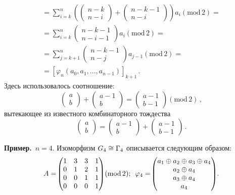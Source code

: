 \begin{multicols}{2}
\noindent
  \begin{multline*}
    {}=\sum\limits^n_{i=k} \left( \begin{pmatrix} n-k\\ n-i\end{pmatrix}+ 
 \begin{pmatrix} n-k-1\\ n-i\end{pmatrix}\right) 
 a_i \left( \mathrm{mod}\,2\right) ={}\\
  {}= 
  \sum\limits^n_{i=k} \begin{pmatrix} n-k-1\\ n-i-1\end{pmatrix} 
  a_i\left( \mathrm{mod}\,2\right)={}\\
  {}=\sum\limits^n_{j=k+1} \begin{pmatrix} n-k-1\\ n-j\end{pmatrix} 
  a_{j-1} \left(\mathrm{mod}\,2\right)={}\\
  {}=
  \left[ \varphi_n\left( a_0, a_1, \ldots , a_{n-1}\right)\right]_{k+1}\,.
  \end{multline*}
  Здесь использовалось соотношение: 
  $$
  \begin{pmatrix}
  a\\b\end{pmatrix} +\begin{pmatrix}
  a-1\\b \end{pmatrix}= \begin{pmatrix}
  a-1\\ b-1 \end{pmatrix} \left( \mathrm{mod}\,2\right)\,,
  $$
  вытекающее из известного комбинаторного тождества
  $$
  \begin{pmatrix}
  a\\b\end{pmatrix}=\begin{pmatrix}
  a-1\\ b \end{pmatrix}+\begin{pmatrix}
  a-1\\ b-1\end{pmatrix}\,.
  $$
  
  
  \noindent
  \textbf{Пример.}\ $n=4$. Изоморфизм $G_4\hm\cong \Gamma_4$ 
описывается следующим образом:
  $$
  A=\!\begin{pmatrix} 
  1&3&3&1\\
  0&1&2&1\\
  0&0&1&1\\
  0&0&0&1\end{pmatrix}\!\left(\mathrm{mod}\,2\right)\!;\enskip
  \varphi_4=\!\begin{pmatrix}
  a_1\oplus a_2\oplus a_3\oplus a_4\\
  a_2\oplus a_4\\
  a_3\oplus a_4\\
  a_4 \end{pmatrix}\!.
  $$
  

\end{multicols}
